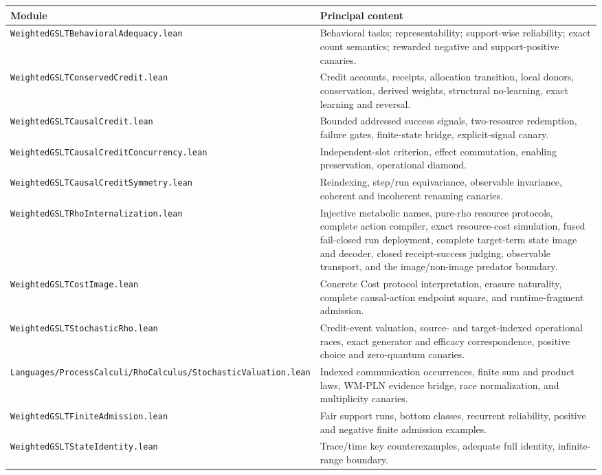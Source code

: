 \documentclass[11pt]{article}
\newcommand{\codepath}[1]{\nolinkurl{#1}}
\begin{document}
\begin{tabularx}{\textwidth}{@{}>{\raggedright\arraybackslash}p{}X@{}}
\toprule
Module & Principal content\\
\midrule
\codepath{WeightedGSLTBehavioralAdequacy.lean}
  & Behavioral tasks; representability; support-wise reliability; exact
    count semantics; rewarded negative and support-positive canaries.\\
\codepath{WeightedGSLTConservedCredit.lean}
  & Credit accounts, receipts, allocation transition, local donors,
    conservation, derived weights, structural no-learning, exact learning and
    reversal.\\
\codepath{WeightedGSLTCausalCredit.lean}
  & Bounded addressed success signals, two-resource redemption, failure
    gates, finite-state bridge, explicit-signal canary.\\
\codepath{WeightedGSLTCausalCreditConcurrency.lean}
  & Independent-slot criterion, effect commutation, enabling preservation,
    operational diamond.\\
\codepath{WeightedGSLTCausalCreditSymmetry.lean}
  & Reindexing, step/run equivariance, observable invariance, coherent and
    incoherent renaming canaries.\\
\codepath{WeightedGSLTRhoInternalization.lean}
  & Injective metabolic names, pure-rho resource protocols, complete action
    compiler, exact resource-cost simulation, fused fail-closed run
    deployment, complete target-term state image and decoder, closed
    receipt-success judging, observable transport, and the image/non-image
    predator boundary.\\
\codepath{WeightedGSLTCostImage.lean}
  & Concrete Cost protocol interpretation, erasure naturality, complete
    causal-action endpoint square, and runtime-fragment admission.\\
\codepath{WeightedGSLTStochasticRho.lean}
  & Credit-event valuation, source- and target-indexed operational races,
    exact generator and efficacy correspondence, positive choice and
    zero-quantum canaries.\\
\codepath{Languages/ProcessCalculi/RhoCalculus/StochasticValuation.lean}
  & Indexed communication occurrences, finite sum and product laws, WM-PLN
    evidence bridge, race normalization, and multiplicity canaries.\\
\codepath{WeightedGSLTFiniteAdmission.lean}
  & Fair support runs, bottom classes, recurrent reliability, positive and
    negative finite admission examples.\\
\codepath{WeightedGSLTStateIdentity.lean}
  & Trace/time key counterexamples, adequate full identity, infinite-range
    boundary.\\
\bottomrule
\end{tabularx}
\end{document}
